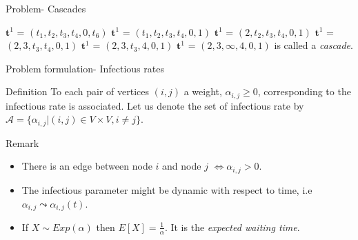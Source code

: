 \documentclass{beamer}
\begin{document}
\begin{frame}{Problem- Cascades}
\begin{figure}
\begin{subfigure}{.4\textwidth}
\end{subfigure}
\end{figure}
 {$\textbf{t}^1$ = $(t_1,t_2,t_3,t_4,0,t_6)$}
 {$\textbf{t}^1$ = $(t_1,t_2,t_3,t_4,0,1)$}
 {$\textbf{t}^1$ = $(2,t_2,t_3,t_4,0,1)$}
 {$\textbf{t}^1$ = $(2,3,t_3,t_4,0,1)$}
 {$\textbf{t}^1$ = $(2,3,t_3,4,0,1)$}
 {$\textbf{t}^1$ = $(2,3,\infty,4,0,1)$ is called a \textit{cascade}.}
\end{frame}
\begin{frame}{Problem formulation- Infectious rates}
\begin{block}{Definition}
To each pair of vertices $(i,j)$ a weight, $\alpha_{i,j} \geq 0$, corresponding to the infectious rate is associated. Let us denote the set of infectious rate by $\mathscr{A} = \{\alpha_{i,j}|(i,j)\in V \times V, i\neq j\}.$
\end{block}
\begin{block}{Remark}
\begin{itemize}
    \item There is an edge between node $i$ and node $j$ $\iff \alpha_{i,j} > 0$.
    \item The infectious parameter might be dynamic with respect to time, i.e $\alpha_{i,j} \leadsto \alpha_{i,j}(t)$.
    \item If $X{\sim} Exp(\alpha)$ then $E[X]=\frac{1}{\alpha}$. It is the \textit{expected waiting time}.
\end{itemize}
\end{block}

\end{frame}
\end{document}

